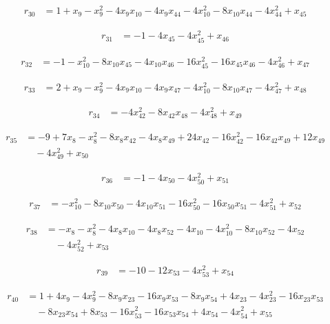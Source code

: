\begin{align*}
r_{30}&=1+x_{9}-x_{9}^{2}-4x_{9}x_{10}-4x_{9}x_{44}-4x_{10}^{2}-8x_{10}x_{44}-4x_{44}^{2}+x_{45}
\end{align*}

\begin{align*}
r_{31}&=-1-4x_{45}-4x_{45}^{2}+x_{46}
\end{align*}

\begin{align*}
r_{32}&=-1-x_{10}^{2}-8x_{10}x_{45}-4x_{10}x_{46}-16x_{45}^{2}-16x_{45}x_{46}-4x_{46}^{2}+x_{47}
\end{align*}

\begin{align*}
r_{33}&=2+x_{9}-x_{9}^{2}-4x_{9}x_{10}-4x_{9}x_{47}-4x_{10}^{2}-8x_{10}x_{47}-4x_{47}^{2}+x_{48}
\end{align*}

\begin{align*}
r_{34}&=-4x_{42}^{2}-8x_{42}x_{48}-4x_{48}^{2}+x_{49}
\end{align*}

\begin{align*}
r_{35}&=-9+7x_{8}-x_{8}^{2}-8x_{8}x_{42}-4x_{8}x_{49}+24x_{42}-16x_{42}^{2}-16x_{42}x_{49}+12x_{49}\\
&\quad -4x_{49}^{2}+x_{50}
\end{align*}

\begin{align*}
r_{36}&=-1-4x_{50}-4x_{50}^{2}+x_{51}
\end{align*}

\begin{align*}
r_{37}&=-x_{10}^{2}-8x_{10}x_{50}-4x_{10}x_{51}-16x_{50}^{2}-16x_{50}x_{51}-4x_{51}^{2}+x_{52}
\end{align*}

\begin{align*}
r_{38}&=-x_{8}-x_{8}^{2}-4x_{8}x_{10}-4x_{8}x_{52}-4x_{10}-4x_{10}^{2}-8x_{10}x_{52}-4x_{52}\\
&\quad -4x_{52}^{2}+x_{53}
\end{align*}

\begin{align*}
r_{39}&=-10-12x_{53}-4x_{53}^{2}+x_{54}
\end{align*}

\begin{align*}
r_{40}&=1+4x_{9}-4x_{9}^{2}-8x_{9}x_{23}-16x_{9}x_{53}-8x_{9}x_{54}+4x_{23}-4x_{23}^{2}-16x_{23}x_{53}\\
&\quad -8x_{23}x_{54}+8x_{53}-16x_{53}^{2}-16x_{53}x_{54}+4x_{54}-4x_{54}^{2}+x_{55}
\end{align*}

